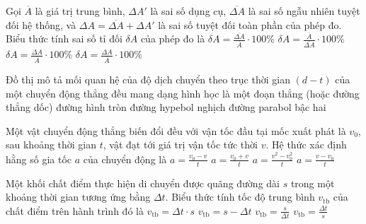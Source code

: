 	\begin{ex}%
		Gọi $\overline{A}$ là giá trị trung bình, $\Delta A'$ là sai số dụng cụ, $\overline{\Delta A}$ là sai số ngẫu nhiên tuyệt đối hệ thống, và $\Delta A = \overline{\Delta A} + \Delta A'$ là sai số tuyệt đối toàn phần của phép đo. Biểu thức tính sai số tỉ đối $\delta A$ của phép đo là
		\choice
		{$\delta A=\frac{\overline{\Delta A}}{\overline{A}} \cdot 100\%$}
		{$\delta A=\frac{\overline{A}}{\overline{\Delta A}} \cdot 100\%$}
		{$\delta A=\frac{\Delta A}{\overline{A}} \cdot 100\%$}
		{\True $\delta A=\frac{\Delta A}{\overline{A}} \cdot 100\%$}
	\end{ex}
	
	\begin{ex}%
		Đồ thị mô tả mối quan hệ của độ dịch chuyển theo trục thời gian $(d-t)$ của một chuyển động thẳng đều mang dạng hình học là một
		\choice
		{\True đoạn thẳng (hoặc đường thẳng dốc)}
		{đường hình tròn}
		{đường hypebol nghịch}
		{đường parabol bậc hai}
	\end{ex}
	
	\begin{ex}%
		Một vật chuyển động thẳng biến đổi đều với vận tốc đầu tại mốc xuất phát là $v_0$, sau khoảng thời gian $t$, vật đạt tới giá trị vận tốc tức thời $v$. Hệ thức xác định hằng số gia tốc $a$ của chuyển động là
		\choice
		{$a = \frac{v_0 - v}{t}$}
		{$a = \frac{v_0 + v}{t}$}
		{$a = \frac{v^2 - v_0^2}{t}$}
		{\True $a = \frac{v - v_0}{t}$}
	\end{ex}
	
	\begin{ex}%
		Một khối chất điểm thực hiện di chuyển được quãng đường dài $s$ trong một khoảng thời gian tương ứng bằng $\Delta t$. Biểu thức tính tốc độ trung bình $v_{\text{tb}}$ của chất điểm trên hành trình đó là
		\choice
		{$v_{\text{tb}} = \Delta t \cdot s$}
		{$v_{\text{tb}} = s - \Delta t$}
		{\True $v_{\text{tb}} = \frac{s}{\Delta t}$}
		{$v_{\text{tb}} = \frac{\Delta t}{s}$}
	\end{ex}
	
